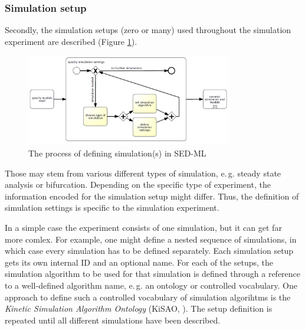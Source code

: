 \subsubsection{Simulation setup}
\label{overview:simulation}
Secondly, the simulation setups (zero or many) used throughout the simulation experiment are described (Figure \ref{fig:workflowSimulation}). 
%
%
\begin{figure}[h]
\centering
\includegraphics[width=0.8\textwidth]{images/bpmn/sedSimulationOryx.png}
\caption{The process of defining simulation(s) in SED-ML}
\label{fig:workflowSimulation}
\end{figure}
%
Those may stem from various different types of simulation, e.\,g. steady state analysis or bifurcation.  Depending on the specific type of experiment, the information encoded for the simulation setup might differ. Thus, the definition of simulation settings is specific to the simulation experiment.

In a simple case the experiment consists of one simulation, but it can get far more comlex. For example, one might define a nested sequence of simulations, in which case every simulation has to be defined separately.
Each simulation setup gets its own internal ID and an optional name. For each of the setups, the simulation algorithm to be used for that simulation is defined through a reference to a well-defined algorithm name, e.\,g. an ontology or controlled vocabulary. One approach to define such a controlled vocabulary of simulation algorihtms is the \emph{Kinetic Simulation Algorithm Ontology} (KiSAO, \cite{KL08}). 
%
The setup definition is repeated until all different simulations have been described.

